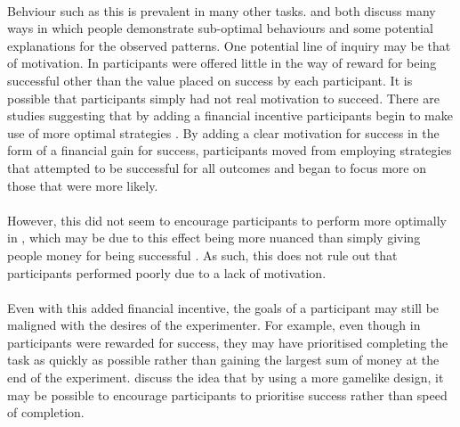 \documentclass[12pt]{article}
\begin{document}
\paragraph{} Behviour such as this is prevalent in many other tasks. \cite{KahnemanChoicesValuseFrames} and \cite{Gigerenzer2011} both discuss many ways in which people demonstrate sub-optimal behaviours and some potential explanations for the observed patterns. One potential line of inquiry may be that of motivation. In \cite{clarke2015failure} participants were offered little in the way of reward for being successful other than the value placed on success by each participant. It is possible that participants simply had not real motivation to succeed. There are studies suggesting that by adding a financial incentive participants begin to make use of more optimal strategies \citep{Goodnow1955,phillips1966conservatism}. By adding a clear motivation for success in the form of a financial gain for success, participants moved from employing strategies that attempted to be successful for all outcomes and began to focus more on those that were more likely.

\paragraph{} However, this did not seem to encourage participants to perform more optimally in \cite{morvan2012human}, which may be due to this effect being more nuanced than simply giving people money for being successful \citep{Camerer1999}. As such, this does not rule out that participants performed poorly due to a lack of motivation. 

\paragraph{} Even with this added financial incentive, the goals of a participant may still be maligned with the desires of the experimenter. For example, even though in \cite{morvan2012human} participants were rewarded for success, they may have prioritised completing the task as quickly as possible rather than gaining the largest sum of money at the end of the experiment. \cite{miranda2014intrinsic} discuss the idea that by using a more gamelike design, it may be possible to encourage participants to prioritise success rather than speed of completion. %
\end{document}
